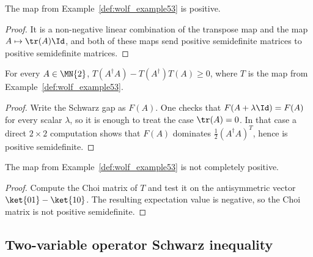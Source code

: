 \begin{theorem}\label{thm:wolf_example53_positive}
    \leanok
    The map from Example~\ref{def:wolf_example53} is positive.
\end{theorem}

\begin{proof}
    \leanok
    It is a non-negative linear combination of the transpose map and the map
    $A \mapsto \tr(A) \Id$, and both of these maps send positive
    semidefinite matrices to positive semidefinite matrices.
\end{proof}

\begin{theorem}\label{thm:wolf_example53_schwarz}
    \leanok
    For every $A \in \MN{2}$,
    $T(A^\dagger A)-T(A^\dagger)T(A)\ge 0$, where $T$ is the map from
    Example~\ref{def:wolf_example53}.
\end{theorem}

\begin{proof}
    \leanok
    Write the Schwarz gap as $F(A)$.
    One checks that $F(A + \lambda \Id) = F(A)$ for every scalar $\lambda$,
    so it is enough to treat the case $\tr(A) = 0$.
    In that case a direct $2 \times 2$ computation shows that
    $F(A)$ dominates $\frac{1}{2} (A^\dagger A)^T$, hence is positive semidefinite.
\end{proof}

\begin{theorem}\label{thm:wolf_example53_not_cp}
    \leanok
    The map from Example~\ref{def:wolf_example53} is not completely positive.
\end{theorem}

\begin{proof}
    \leanok
    Compute the Choi matrix of $T$ and test it on the antisymmetric vector
    $\ket{01} - \ket{10}$.
    The resulting expectation value is negative, so the Choi matrix is not
    positive semidefinite.
\end{proof}

\subsection{Two-variable operator Schwarz inequality}

